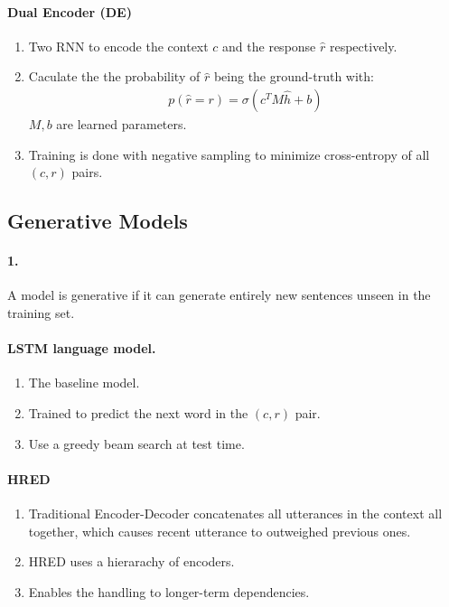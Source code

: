 \documentclass[runningheads]{llncs}
\begin{document}
\paragraph{Dual Encoder (DE)}
\begin{enumerate}
    \item Two RNN to encode the context $c$ and the response $\hat{r}$ respectively.
    \item Caculate the the probability of $\hat{r}$ being the ground-truth with:
    \begin{align}
        p(\hat{r} = r) = \sigma(c^T M \hat{h} + b)
    \end{align}
    $M, b$ are learned parameters.
    \item Training is done with negative sampling to minimize cross-entropy
    of all $(c, r)$ pairs.
\end{enumerate}

\subsection{Generative Models}
\paragraph{1.}
A model is generative if it can generate entirely new sentences unseen in the
training set.

\paragraph{LSTM language model.}
\begin{enumerate}
    \item The baseline model.
    \item Trained to predict the next word in the $(c, r)$ pair.
    \item Use a greedy beam search at test time.
\end{enumerate}

\paragraph{HRED}
\begin{enumerate}
    \item Traditional Encoder-Decoder concatenates all utterances in the context
    all together, which causes recent utterance to outweighed previous ones.
    \item HRED uses a hierarachy of encoders.
    \item Enables the handling to longer-term dependencies.
\end{enumerate}
\end{document}
